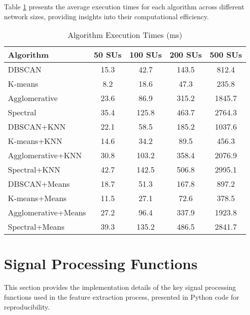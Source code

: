 Table \ref{tab:timing_results} presents the average execution times for each algorithm across different network sizes, providing insights into their computational efficiency.

\begin{table}[htbp]
\centering
\caption{Algorithm Execution Times (ms)}
\label{tab:timing_results}
\begin{tabular}{@{}lcccc@{}}
\toprule
\textbf{Algorithm} & \textbf{50 SUs} & \textbf{100 SUs} & \textbf{200 SUs} & \textbf{500 SUs} \\
\midrule
DBSCAN & 15.3 & 42.7 & 143.5 & 812.4 \\
K-means & 8.2 & 18.6 & 47.3 & 235.8 \\
Agglomerative & 23.6 & 86.9 & 315.2 & 1845.7 \\
Spectral & 35.4 & 125.8 & 463.7 & 2764.3 \\
DBSCAN+KNN & 22.1 & 58.5 & 185.2 & 1037.6 \\
K-means+KNN & 14.6 & 34.2 & 89.5 & 456.3 \\
Agglomerative+KNN & 30.8 & 103.2 & 358.4 & 2076.9 \\
Spectral+KNN & 42.7 & 142.5 & 506.8 & 2995.1 \\
DBSCAN+Means & 18.7 & 51.3 & 167.8 & 897.2 \\
K-means+Means & 11.5 & 27.1 & 72.6 & 378.5 \\
Agglomerative+Means & 27.2 & 96.4 & 337.9 & 1923.8 \\
Spectral+Means & 39.3 & 135.2 & 486.5 & 2841.7 \\
\bottomrule
\end{tabular}
\end{table}

\section{Signal Processing Functions}
\label{app:signal_processing}

This section provides the implementation details of the key signal processing functions used in the feature extraction process, presented in Python code for reproducibility.

